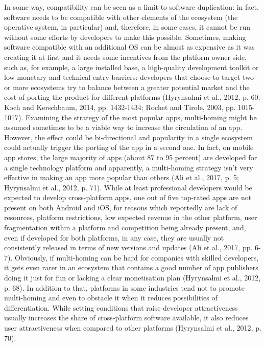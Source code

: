 In some way, compatibility can be seen as a limit to software duplication: in fact, software needs to be compatible with other elements of the ecosystem (the operative system, in particular) and, therefore, in some cases, it cannot be run without some efforts by developers to make this possible. Sometimes, making software compatible with an additional OS can be almost as expensive as it was creating it at first and it needs some incentives from the platform owner side, such as, for example, a large installed base, a high-quality development toolkit or low monetary and technical entry barriers: developers that choose to target two or more ecosystems try to balance between a greater potential market and the cost of porting the product for different platforms (Hyrynsalmi et al., 2012, p. 60; Koch and Kerschbaum, 2014, pp. 1432-1434; Rochet and Tirole, 2003, pp. 1015-1017). Examining the strategy of the most popular apps, multi-homing might be assumed sometimes to be a viable way to increase the circulation of an app. However, the effect could be bi-directional and popularity in a single ecosystem could actually trigger the porting of the app in a second one. In fact, on mobile app stores, the large majority of apps (about 87 to 95 percent) are developed for a single technology platform and apparently, a multi-homing strategy isn't very effective in making an app more popular than others (Ali et al., 2017, p. 5; Hyrynsalmi et al., 2012, p. 71). While at least professional developers would be expected to develop cross-platform apps, one out of five top-rated apps are not present on both Android and iOS, for reasons which reportedly are lack of resources, platform restrictions, low expected revenue in the other platform, user fragmentation within a platform and competition being already present, and, even if developed for both platforms, in any case, they are usually not consistently released in terms of new versions and updates (Ali et al., 2017, pp. 6-7). Obviously, if multi-homing can be hard for companies with skilled developers, it gets even rarer in an ecosystem that contains a good number of app publishers doing it just for fun or lacking a clear monetisation plan (Hyrynsalmi et al., 2012, p. 68). In addition to that, platforms in some industries tend not to promote multi-homing and even to obstacle it when it reduces possibilities of differentiation. While setting conditions that raise developer attractiveness usually increases the share of cross-platform software available, it also reduces user attractiveness when compared to other platforms (Hyrynsalmi et al., 2012, p. 70).

